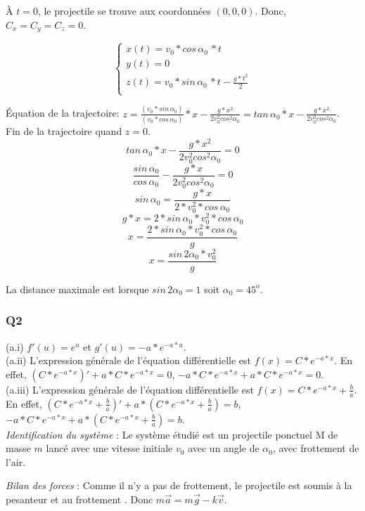 \documentclass[]{book}
\theoremstyle{definition}
\begin{document}
\`A $t=0$, le projectile se trouve aux coordonn\'ees $(0,0,0)$. Donc, $C_x=C_y=C_z=0$.

$$
\left\{
\begin{array}{l}
 x(t) = v_0*cos\, \alpha_0\, *t\\
 y(t) = 0\\
 z(t) = v_0*sin\, \alpha_0\, *t - \frac{g*t^2}{2} \\
\end{array}
\right. 
$$

\'Equation de la trajectoire: $z = \frac{(v_0*sin\, \alpha_0)}{(v_0*cos\, \alpha_0)}*x - \frac{g*x^2}{2v_0^2cos^2\alpha_0} = tan\, \alpha_0*x - \frac{g*x^2}{2v_0^2cos^2\alpha_0}$. \\

Fin de la trajectoire quand $z=0$. 
$$tan\, \alpha_0*x - \frac{g*x^2}{2v_0^2cos^2\alpha_0} = 0$$
$$\frac{sin\, \alpha_0}{cos\, \alpha_0} - \frac{g*x}{2v_0^2cos^2\alpha_0} = 0$$
$$sin\, \alpha_0 = \frac{g*x}{2*v_0^2*cos\, \alpha_0}$$
$$g*x= 2*sin\, \alpha_0*v_0^2*cos\, \alpha_0$$
$$x= \frac{2*sin\, \alpha_0*v_0^2*cos\, \alpha_0}{g}$$
$$x= \frac{sin\, 2\alpha_0*v_0^2}{g}$$

La distance maximale est lorsque $sin\, 2\alpha_0 = 1$ soit $\alpha_0 = 45^{o}$.


\subsubsection*{Q2}

(a.i) $f'(u) = e^u$ et $g'(u) = -a*e^{-a*u}$.\\
(a.ii) L'expression g\'en\'erale de l'\'equation diff\'erentielle est $f(x) = C*e^{-a*x}$. En effet, $(C*e^{-a*x})' + a*C*e^{-a*x} = 0$, $-a*C*e^{-a*x} + a*C*e^{-a*x} = 0$. \\
(a.iii) L'expression g\'en\'erale de l'\'equation diff\'erentielle est $f(x) = C*e^{-a*x} + \frac{b}{a}$. En effet, $(C*e^{-a*x}+\frac{b}{a})' + a*(C*e^{-a*x}+\frac{b}{a}) = b$, $-a*C*e^{-a*x} + a*(C*e^{-a*x} + \frac{b}{a}) = b$.\\


\emph{Identification du syst\`eme} : Le syst\`eme \'etudi\'e est un projectile ponctuel M de masse $m$ lanc\'e avec une vitesse initiale $v_0$ avec un angle de $\alpha_0$, avec frottement de l'air. 


\emph{Bilan des forces} : Comme il n'y a pas de frottement, le projectile est soumis \`a la pesanteur et au frottement . Donc $m \overrightarrow{a} = m \overrightarrow{g} - k \overrightarrow{v}$.
 
\end{document}

